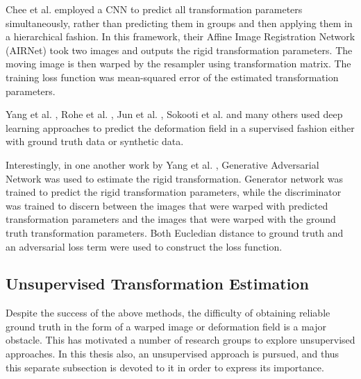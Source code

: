 \documentclass{book}
\begin{document}
	
	
	
	Chee et al. \cite{https://doi.org/10.48550/arxiv.1810.02583} employed a CNN to predict all transformation parameters simultaneously, rather than predicting them in groups and then applying them in a hierarchical fashion. In this framework, their Affine Image Registration Network (AIRNet) took two images and outputs the rigid transformation parameters. The moving image is then warped by the resampler using transformation matrix. The training loss function was mean-squared error of the estimated transformation parameters.
	
	
	Yang et al. \cite{10.1007/978-3-319-46976-8_6}, Rohe et al. \cite{Roh2017SVFNetLD}, Jun et al. \cite{Jun}, Sokooti et al. \cite{10.1007/978-3-319-66182-7_27} and many others used deep learning approaches to predict the deformation field in a supervised fashion either with ground truth data or synthetic data.
	
	Interestingly, in one another work by Yang et al. \cite{https://doi.org/10.48550/arxiv.1804.11024}, Generative Adversarial Network was used to estimate the rigid transformation. Generator network was trained to predict the rigid transformation parameters, while the discriminator was trained to discern between the images that were warped with predicted transformation parameters and the images that were warped with the ground truth transformation parameters. Both Eucledian distance to ground truth and an adversarial loss term were used to construct the loss function.
	
	\subsection{Unsupervised Transformation Estimation}
	Despite the success of the above methods, the difficulty of obtaining reliable ground truth in the form of a warped image or deformation field is a major obstacle. This has motivated a number of research groups to explore unsupervised approaches. In this thesis also, an unsupervised approach is pursued, and thus this separate subsection is devoted to it in order to express its importance.
	
\end{document}
